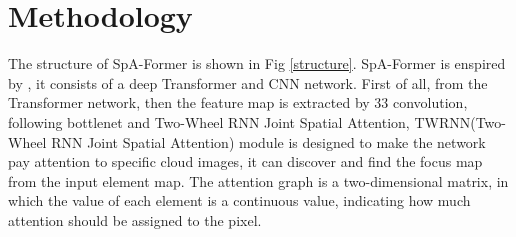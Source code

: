 \documentclass[journal]{IEEEtran}
\begin{document}
\section{Methodology}
 The structure of SpA-Former is shown in Fig \ref{structure}.  SpA-Former is enspired by \cite{18,19}, it consists of a deep Transformer and CNN network. First of all, from the Transformer network, then the feature map is extracted by 33 convolution, following bottlenet and Two-Wheel RNN Joint Spatial Attention, TWRNN(Two-Wheel RNN Joint Spatial Attention) module is designed to make the network pay attention to specific cloud images, it can discover and find the focus map from the input element map. The attention graph is a two-dimensional matrix, in which the value of each element is a continuous value, indicating how much attention should be assigned to the pixel.
\end{document}
